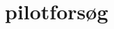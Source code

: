 

\raggedbottom
%
%

\chapter{pilotforsøg}

\newpage
%

\begingroup\label{litteratur}
\raggedright

\endgroup
